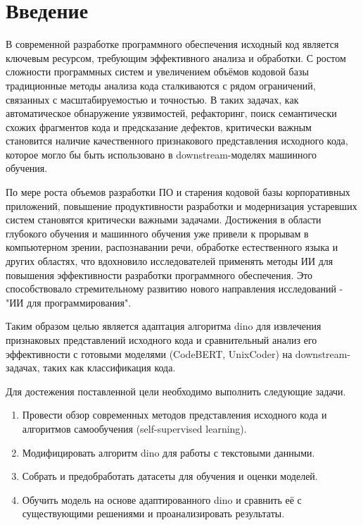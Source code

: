 \documentclass[../document.tex]{subfiles}
\begin{document}
    \section*{Введение}
    \par В современной разработке программного обеспечения исходный код является ключевым ресурсом, требующим эффективного анализа и обработки. С ростом сложности программных систем и увеличением объёмов кодовой базы традиционные методы анализа кода сталкиваются с рядом ограничений, связанных с масштабируемостью и точностью. В таких задачах, как автоматическое обнаружение уязвимостей, рефакторинг, поиск семантически схожих фрагментов кода и предсказание дефектов, критически важным становится наличие качественного признакового представления исходного кода, которое могло бы быть использовано в downstream-моделях машинного обучения.
    \par По мере роста объемов разработки ПО и старения кодовой базы корпоративных приложений, повышение продуктивности разработки и модернизация устаревших систем становятся критически важными задачами. Достижения в области глубокого обучения и машинного обучения уже привели к прорывам в компьютерном зрении, распознавании речи, обработке естественного языка и других областях, что вдохновило исследователей применять методы ИИ для повышения эффективности разработки программного обеспечения. Это способствовало стремительному развитию нового направления исследований - "ИИ для программирования". 
    \par Таким образом целью является адаптация алгоритма \gls{dino} для извлечения признаковых представлений исходного кода и сравнительный анализ его эффективности с готовыми моделями (CodeBERT, UnixCoder) на downstream-задачах, таких как классификация кода.
    \par Для достежения поставленной цели необходимо выполнить следующие задачи.
    \begin{enumerate}
        \item Провести обзор современных методов представления исходного кода и алгоритмов самообучения (self-supervised learning).
        \item Модифицировать алгоритм \gls{dino} для работы с текстовыми данными.
        \item Собрать и предобработать датасеты для обучения и оценки моделей.
        \item Обучить модель на основе адаптированного \gls{dino} и сравнить её с существующими решениями и проанализировать результаты.
    \end{enumerate}
\end{document}
